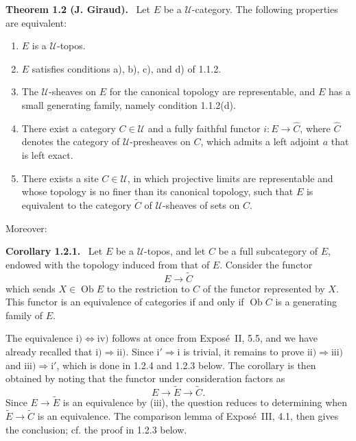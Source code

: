 \documentclass[11pt]{article}
\newcommand{\U}{\mathcal{U}}
\newcommand{\Ob}{\operatorname{Ob}}
\newenvironment{statement}[1]{\par\medskip\noindent\textbf{#1.}\ }{\par\medskip}
\begin{document}
\begin{statement}{Theorem 1.2 (J. Giraud)}
Let \(E\) be a \(\U\)-category. The following properties are equivalent:
\begin{enumerate}[label=\roman*)]
\item \(E\) is a \(\U\)-topos.
\item \(E\) satisfies conditions a), b), c), and d) of 1.1.2.
\item The \(\U\)-sheaves on \(E\) for the canonical topology are representable, and \(E\) has a small generating family, namely condition 1.1.2(d).
\item There exist a category \(C\in\U\) and a fully faithful functor \(i:E\to\widehat C\), where \(\widehat C\) denotes the category of \(\U\)-presheaves on \(C\), which admits a left adjoint \(a\) that is left exact.
\item[\({\rm i'}\)] There exists a site \(C\in\U\), in which projective limits are representable and whose topology is no finer than its canonical topology, such that \(E\) is equivalent to the category \(\widetilde C\) of \(\U\)-sheaves of sets on \(C\).
\end{enumerate}
\end{statement}

Moreover:

\begin{statement}{Corollary 1.2.1}
Let \(E\) be a \(\U\)-topos, and let \(C\) be a full subcategory of \(E\), endowed with the topology induced from that of \(E\). Consider the functor
\[
E\longrightarrow \widetilde C
\]
which sends \(X\in\Ob E\) to the restriction to \(C\) of the functor represented by \(X\). This functor is an equivalence of categories if and only if \(\Ob C\) is a generating family of \(E\).
\end{statement}

The equivalence \(\mathrm{i)}\Leftrightarrow\mathrm{iv)}\) follows at once from Expos\'e~II, 5.5, and we have already recalled that \(\mathrm{i)}\Rightarrow\mathrm{ii)}\). Since \(\mathrm{i'}\Rightarrow\mathrm{i}\) is trivial, it remains to prove \(\mathrm{ii)}\Rightarrow\mathrm{iii)}\) and \(\mathrm{iii)}\Rightarrow\mathrm{i'}\), which is done in 1.2.4 and 1.2.3 below. The corollary is then obtained by noting that the functor under consideration factors as
\[
E\longrightarrow \widetilde E\longrightarrow \widetilde C.
\]
Since \(E\to\widetilde E\) is an equivalence by (iii), the question reduces to determining when \(\widetilde E\to\widetilde C\) is an equivalence. The comparison lemma of Expos\'e~III, 4.1, then gives the conclusion; cf. the proof in 1.2.3 below.
\end{document}
